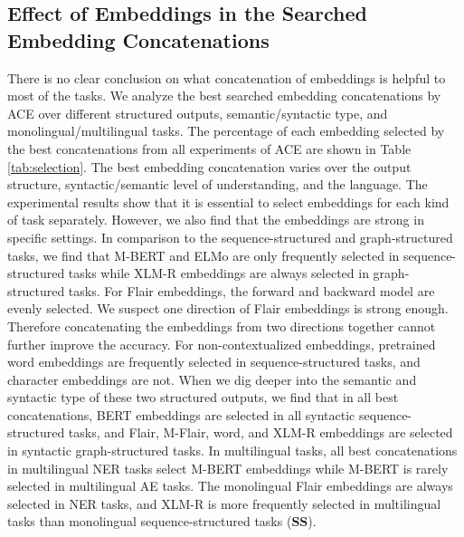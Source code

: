 \documentclass{article} \usepackage{iclr2021_conference,times}
\begin{document}
\subsection{Effect of Embeddings in the Searched Embedding Concatenations}
There is no clear conclusion on what concatenation of embeddings is helpful to most of the tasks. 
We analyze the best searched embedding concatenations by ACE over different structured outputs, semantic/syntactic type, and monolingual/multilingual tasks. 
The percentage of each embedding selected by the best concatenations from all experiments of ACE are shown in Table \ref{tab:selection}. 
The best embedding concatenation varies over the output structure, syntactic/semantic level of understanding, and the language. 
The experimental results show that it is essential to select embeddings for each kind of task separately. 
However, we also find that the embeddings are strong in specific settings. In comparison to the sequence-structured and graph-structured tasks, we find that M-BERT and ELMo are only frequently selected in sequence-structured tasks while XLM-R embeddings are always selected in graph-structured tasks. 
For Flair embeddings, the forward and backward model are evenly selected. 
We suspect one direction of Flair embeddings is strong enough. 
Therefore concatenating the embeddings from two directions together cannot further improve the accuracy. 
For non-contextualized embeddings, pretrained word embeddings are frequently selected in sequence-structured tasks, and character embeddings are not.
When we dig deeper into the semantic and syntactic type of these two structured outputs, we find that in all best concatenations, BERT embeddings are selected in all syntactic sequence-structured tasks, and Flair, M-Flair, word, and XLM-R embeddings are selected in syntactic graph-structured tasks. 
In multilingual tasks, all best concatenations in multilingual NER tasks select M-BERT embeddings while M-BERT is rarely selected in multilingual AE tasks. 
The monolingual Flair embeddings are always selected in NER tasks, and XLM-R is more frequently selected in multilingual tasks than monolingual sequence-structured tasks (\textbf{SS}).
\end{document}
